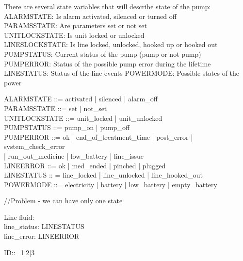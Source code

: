 \documentclass{article}
\begin{document}
	
	There are several state variables that will describe state of the pump:\\
	ALARMSTATE: Is alarm activated, silenced or turned off\\
	PARAMSSTATE: Are parameters set or not set\\
	UNITLOCKSTATE: Is unit locked or unlocked \\
	LINESLOCKSTATE: Is line locked, unlocked, hooked up or hooked out\\
	PUMPSTATUS: Current status of the pump (pump or not pump)\\
	PUMPERROR: Status of the possible pump error during the lifetime\\
	LINESTATUS: Status of the line events
	POWERMODE: Possible states of the power
	
	\begin{zed}	
		
		
		ALARMSTATE ::= activated | silenced | alarm\_off \\
		
		PARAMSSTATE ::= set | not\_set \\
	
		UNITLOCKSTATE ::= unit\_locked | unit\_unlocked \\
	
		PUMPSTATUS ::= pump\_on | pump\_off \\		
		
		PUMPERROR ::= ok | end\_of\_treatment\_time | post\_error | system\_check\_error \\ | run\_out\_medicine | low\_battery | line\_issue \\
		
		LINEERROR ::= ok | med\_ended | pinched | plugged \\
		
		LINESTATUS :: = line\_locked | line\_unlocked | line\_hooked\_out \\
		
		POWERMODE ::= electricity | battery | low\_battery | empty\_battery \\
	\end{zed}
	
	//Problem - we can have only one state
	
	\begin{schema}{Line}
		fluid: \nat \\
		line\_status: LINESTATUS \\
		line\_error: LINEERROR 
	\end{schema}
	
	\begin{zed}
		ID::=1|2|3
	\end{zed}
		
\end{document}
